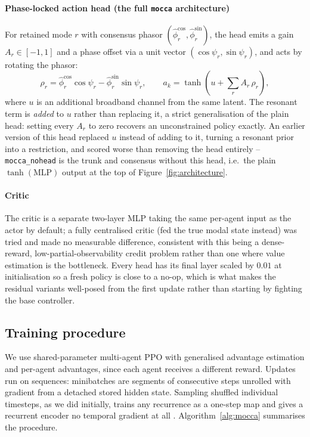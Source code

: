 \documentclass[11pt]{article}
\begin{document}
\paragraph{Phase-locked action head (the full \texttt{mocca} architecture)}
For retained mode $r$ with consensus phasor $(\hat\phi_r^{\cos},
\hat\phi_r^{\sin})$, the head emits a gain $A_r \in [-1,1]$ and a phase
offset via a unit vector $(\cos\psi_r, \sin\psi_r)$, and acts by rotating
the phasor:
\begin{equation}
\rho_r = \hat\phi_r^{\cos}\cos\psi_r - \hat\phi_r^{\sin}\sin\psi_r, \qquad
a_k = \tanh\!\left(u + \sum_{r} A_r\, \rho_r\right),
\label{eq:phaselocked}
\end{equation}
where $u$ is an additional broadband channel from the same latent. The
resonant term is \emph{added} to $u$ rather than replacing it, a strict
generalisation of the plain head: setting every $A_r$ to zero recovers an
unconstrained policy exactly. An earlier version of this head replaced $u$
instead of adding to it, turning a resonant prior into a restriction, and
scored worse than removing the head entirely -- \texttt{mocca\_nohead} is
the trunk and consensus without this head, i.e.\ the plain
$\tanh(\mathrm{MLP})$ output at the top of Figure~\ref{fig:architecture}.

\paragraph{Critic}
The critic is a separate two-layer MLP taking the same per-agent input as
the actor by default; a fully centralised critic (fed the true modal state
instead) was tried and made no measurable difference, consistent with this
being a dense-reward, low-partial-observability credit problem rather than
one where value estimation is the bottleneck. Every head has its final
layer scaled by $0.01$ at initialisation so a fresh policy is close to a
no-op, which is what makes the residual variants well-posed from the first
update rather than starting by fighting the base controller.

\subsection*{Training procedure}

We use shared-parameter multi-agent PPO \citep{schulman2017ppo,yu2022mappo}
with generalised advantage estimation \citep{schulman2016gae} and per-agent
advantages, since each agent receives a different reward. Updates run on
sequences: minibatches are segments of consecutive steps unrolled with
gradient from a detached stored hidden state. Sampling shuffled individual
timesteps, as we did initially, trains any recurrence as a one-step map and
gives a recurrent encoder no temporal gradient at all
\citep{hausknecht2015drqn}. Algorithm~\ref{alg:mocca} summarises the
procedure.
\end{document}
